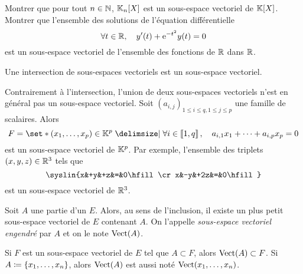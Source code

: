 \documentclass{magnolia}
\begin{document}
\begin{exoUnique}
\exo Montrer que pour tout $n\in\mathbb{N}$, $\polyK[n]$ est un sous-espace vectoriel de $\polyK$.
\exo Montrer que l'ensemble des solutions de l'équation différentielle
  \[\forall t\in\mathbb{R},\quad y'(t)+{\rm e}^{-t^2}y(t)=0\]
  est un sous-espace vectoriel de l'ensemble des fonctions de $\mathbb{R}$ dans $\mathbb{R}$.
\end{exoUnique}



\begin{proposition}[utile=-3]
Une intersection de sous-espaces vectoriels est un sous-espace vectoriel.
\end{proposition}

\begin{remarques}
\remarque[utile=-1] Contrairement à l'intersection, l'union de deux sous-espaces
  vectoriels n'est en général pas un sous-espace vectoriel.
\remarque[utile=-2] Soit $(a_{i,j})_{1\leq i\leq q, 1\leq j\leq p}$ une famille de
  scalaires. Alors
  \[F=\enstq{(x_1,\ldots,x_p)\in\K^p}%
    {\forall i\in\intere{1}{q} \qsep
     a_{i,1} x_1+\cdots+a_{i,p} x_p=0}\]
  est un sous-espace vectoriel de $\mathbb{K}^p$. Par exemple, l'ensemble des triplets $(x,y,z)\in\mathbb{R}^3$ tels que
  \[\syslin{x&+y&+z&=&0\hfill\cr
            x&-y&+2z&=&0\hfill}\]
  est un sous-espace vectoriel de $\mathbb{R}^3$.
\end{remarques}

\begin{definition}[utile=-2]
Soit $A$ une partie d'un \Kev $E$. Alors, au sens de l'inclusion, il existe un plus petit
sous-espace vectoriel de $E$ contenant $A$. On l'appelle \emph{sous-espace vectoriel
engendré} par $A$ et on le note $\operatorname{Vect}(A)$.
\end{definition}

\begin{remarques}
\remarque Si $F$ est un sous-espace vectoriel de $E$ tel que $A\subset F$, alors
  $\operatorname{Vect}(A)\subset F$.
\remarque Si $A\coloneqq\left\{x_1,\ldots,x_n\right\}$, alors $\operatorname{Vect}(A)$ est aussi noté
  $\operatorname{Vect}(x_1,\ldots,x_n)$.
\end{remarques}
\end{document}

